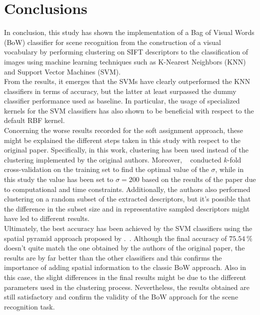 \documentclass[../main.tex]{subfiles}
\begin{document}
\section{Conclusions}\label{sec:conclusions}

In conclusion, this study has shown the implementation of a Bag of Visual Words
(BoW) classifier for scene recognition from the construction of a visual
vocabulary by performing clustering on SIFT descriptors to the classification of
images using machine learning techniques such as K-Nearest Neighbors (KNN) and Support Vector Machines (SVM).\\
From the results, it emerges that the SVMs have clearly outperformed the KNN
classifiers in terms of accuracy, but the latter at least surpassed the dummy
classifier performance used as baseline. In particular, the usage of specialized
kernels for the SVM classifiers has also shown to be beneficial with respect to the default RBF kernel.\\
Concerning the worse results recorded for the soft assignment approach, these
might be explained the different steps taken in this study with respect to the
original paper. Specifically, in this work,  clustering has been
used instead of the  clustering implemented by the original
authors. Moreover, ~\cite{gemert} conducted $k$-fold
cross-validation on the training set to find the optimal value of the $\sigma$,
while in this study the value has been set to $\sigma = 200$ based on the
results of the paper due to computational and time constraints. Additionally,
the authors also performed clustering on a random subset of the extracted
descriptors, but it's possible that the difference in the subset size and in
representative sampled descriptors might have led to different results.\\
Ultimately, the best accuracy has been achieved by the SVM classifiers using the
spatial pyramid approach proposed by .~\cite{lazebnik}.
Although the final accuracy of $\SI{75.54}{\percent}$ doesn't quite match the
one obtained by the authors of the original paper, the results are by far better
than the other classifiers and this confirms the importance of adding spatial
information to the classic BoW approach. Also in this case, the slight
differences in the final results might be due to the different parameters used
in the clustering process.
Nevertheless, the results obtained are still satisfactory and confirm the validity of the BoW approach for the scene recognition task.
\end{document}
